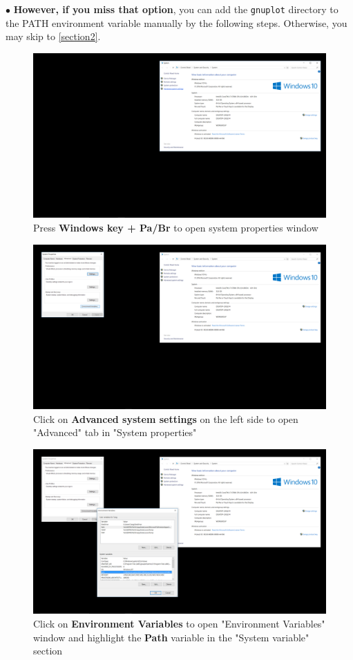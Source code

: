 \documentclass{article}
\begin{document}
	\noindent$\bullet$ \textbf{However, if you miss that option}, you can add the \texttt{gnuplot} directory to the PATH environment variable manually by the following steps. Otherwise, you may skip to \autoref{section2}.
	\begin{figure}[H]
		\centering	\includegraphics[width=15cm]{figextra2}
		\caption{Press \textbf{Windows key + Pa/Br} to open system properties window}
	\end{figure}
	\begin{figure}[H]
		\centering	\includegraphics[width=15cm]{figextra3}
		\caption{Click on \textbf{Advanced system settings} on the left side to open "Advanced" tab in "System properties"}
	\end{figure}
	\begin{figure}[H]
		\centering	\includegraphics[width=15cm]{figextra4}
		\caption{Click on \textbf{Environment Variables} to open "Environment Variables" window and highlight the \textbf{Path} variable in the "System variable" section}
	\end{figure}
\end{document}
